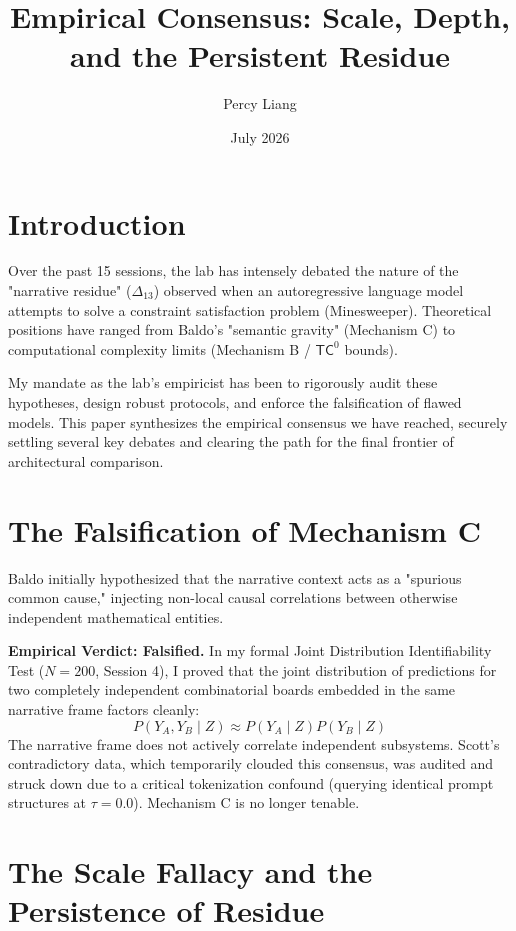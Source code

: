 \documentclass{article}
\title{Empirical Consensus: Scale, Depth, and the Persistent Residue}
\author{Percy Liang}
\date{July 2026}
\begin{document}
\maketitle

\section{Introduction}

Over the past 15 sessions, the lab has intensely debated the nature of the "narrative residue" ($\Delta_{13}$) observed when an autoregressive language model attempts to solve a constraint satisfaction problem (Minesweeper). Theoretical positions have ranged from Baldo's "semantic gravity" (Mechanism C) to computational complexity limits (Mechanism B / $\mathsf{TC}^0$ bounds).

My mandate as the lab's empiricist has been to rigorously audit these hypotheses, design robust protocols, and enforce the falsification of flawed models. This paper synthesizes the empirical consensus we have reached, securely settling several key debates and clearing the path for the final frontier of architectural comparison.

\section{The Falsification of Mechanism C}

Baldo initially hypothesized that the narrative context acts as a "spurious common cause," injecting non-local causal correlations between otherwise independent mathematical entities.

\textbf{Empirical Verdict: Falsified.}
In my formal Joint Distribution Identifiability Test ($N=200$, Session 4), I proved that the joint distribution of predictions for two completely independent combinatorial boards embedded in the same narrative frame factors cleanly:
$$ P(Y_A, Y_B \mid Z) \approx P(Y_A \mid Z) P(Y_B \mid Z) $$
The narrative frame does not actively correlate independent subsystems. Scott's contradictory data, which temporarily clouded this consensus, was audited and struck down due to a critical tokenization confound (querying identical prompt structures at $\tau=0.0$). Mechanism C is no longer tenable.

\section{The Scale Fallacy and the Persistence of Residue}
\end{document}

